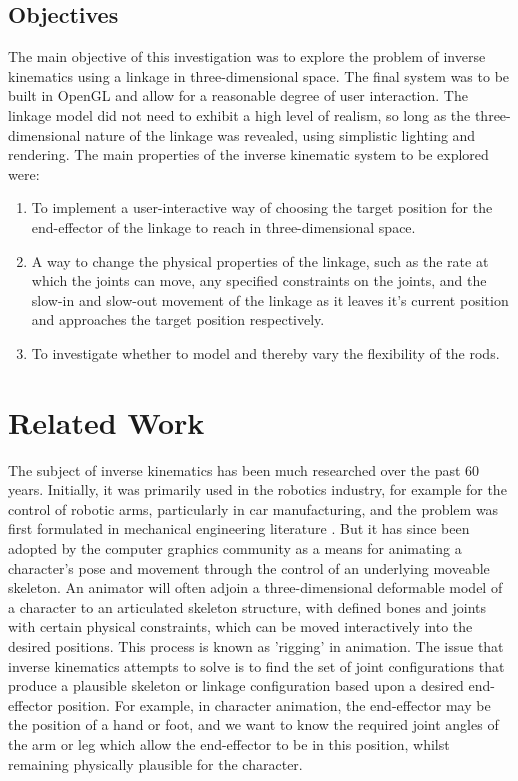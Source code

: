 \documentclass[paper=a4, fontsize=11pt]{scrartcl} %
\numberwithin{equation}{section} %
\numberwithin{figure}{section} %
\numberwithin{table}{section} %
\begin{document}
\subsection{Objectives}

The main objective of this investigation was to explore the problem of inverse kinematics using a linkage in three-dimensional space. The final system was to be built in OpenGL and allow for a reasonable degree of user interaction. The linkage model did not need to exhibit a high level of realism, so long as the three-dimensional nature of the linkage was revealed, using simplistic lighting and rendering. The main properties of the inverse kinematic system to be explored were:

\begin{enumerate}
\item
To implement a user-interactive way of choosing the target position for the end-effector of the linkage to reach in three-dimensional space.

\item
A way to change the physical properties of the linkage, such as the rate at which the joints can move, any specified constraints on the joints, and the slow-in and slow-out movement of the linkage as it leaves it's current position and approaches the target position respectively.

\item
To investigate whether to model and thereby vary the flexibility of the rods.
\end{enumerate} 


\section{Related Work}
The subject of inverse kinematics has been much researched over the past 60 years. Initially, it was primarily used in the robotics industry, for example for the control of robotic arms, particularly in car manufacturing, and the problem was first formulated in mechanical engineering literature \cite{Crai55}. But it has since been adopted by the computer graphics community as a means for animating a character's pose and movement through the control of an underlying moveable skeleton. An animator will often adjoin a three-dimensional deformable model of a character to an articulated skeleton structure, with defined bones and joints with certain physical constraints, which can be moved interactively into the desired positions. This process is known as 'rigging' in animation. The issue that inverse kinematics attempts to solve is to find the set of joint configurations that produce a plausible skeleton or linkage configuration based upon a desired end-effector position. For example, in character animation, the end-effector may be the position of a hand or foot, and we want to know the required joint angles of the arm or leg which allow the end-effector to be in this position, whilst remaining physically plausible for the character. \\
\end{document}
